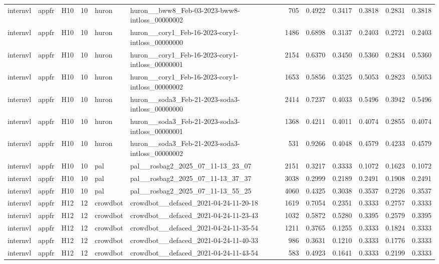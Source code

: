 \begin{table}[tbp]
\begin{tabular}{lllrllrrrrrr}
internvl & appfr & H10 & 10 & huron & huron\_\_bww8\_Feb-03-2023-bww8-intloss\_00000002 & 705 & 0.4922 & 0.3417 & 0.3818 & 0.2831 & 0.3818 \\
internvl & appfr & H10 & 10 & huron & huron\_\_cory1\_Feb-16-2023-cory1-intloss\_00000000 & 1486 & 0.6898 & 0.3137 & 0.2403 & 0.2721 & 0.2403 \\
internvl & appfr & H10 & 10 & huron & huron\_\_cory1\_Feb-16-2023-cory1-intloss\_00000001 & 2154 & 0.6370 & 0.3450 & 0.5360 & 0.2834 & 0.5360 \\
internvl & appfr & H10 & 10 & huron & huron\_\_cory1\_Feb-16-2023-cory1-intloss\_00000002 & 1653 & 0.5856 & 0.3525 & 0.5053 & 0.2823 & 0.5053 \\
internvl & appfr & H10 & 10 & huron & huron\_\_soda3\_Feb-21-2023-soda3-intloss\_00000000 & 2414 & 0.7237 & 0.4033 & 0.5496 & 0.3942 & 0.5496 \\
internvl & appfr & H10 & 10 & huron & huron\_\_soda3\_Feb-21-2023-soda3-intloss\_00000001 & 1368 & 0.4211 & 0.4011 & 0.4074 & 0.2855 & 0.4074 \\
internvl & appfr & H10 & 10 & huron & huron\_\_soda3\_Feb-21-2023-soda3-intloss\_00000002 & 531 & 0.9266 & 0.4048 & 0.4579 & 0.4233 & 0.4579 \\
internvl & appfr & H10 & 10 & pal & pal\_\_rosbag2\_2025\_07\_11-13\_23\_07 & 2151 & 0.3217 & 0.3333 & 0.1072 & 0.1623 & 0.1072 \\
internvl & appfr & H10 & 10 & pal & pal\_\_rosbag2\_2025\_07\_11-13\_37\_37 & 3038 & 0.2999 & 0.2189 & 0.2491 & 0.1908 & 0.2491 \\
internvl & appfr & H10 & 10 & pal & pal\_\_rosbag2\_2025\_07\_11-13\_55\_25 & 4060 & 0.4325 & 0.3038 & 0.3537 & 0.2726 & 0.3537 \\
internvl & appfr & H12 & 12 & crowdbot & crowdbot\_\_defaced\_2021-04-24-11-20-18 & 1619 & 0.7054 & 0.2351 & 0.3333 & 0.2757 & 0.3333 \\
internvl & appfr & H12 & 12 & crowdbot & crowdbot\_\_defaced\_2021-04-24-11-23-43 & 1032 & 0.5872 & 0.5280 & 0.3395 & 0.2579 & 0.3395 \\
internvl & appfr & H12 & 12 & crowdbot & crowdbot\_\_defaced\_2021-04-24-11-35-54 & 1211 & 0.3765 & 0.1255 & 0.3333 & 0.1824 & 0.3333 \\
internvl & appfr & H12 & 12 & crowdbot & crowdbot\_\_defaced\_2021-04-24-11-40-33 & 986 & 0.3631 & 0.1210 & 0.3333 & 0.1776 & 0.3333 \\
internvl & appfr & H12 & 12 & crowdbot & crowdbot\_\_defaced\_2021-04-24-11-43-54 & 583 & 0.4923 & 0.1641 & 0.3333 & 0.2199 & 0.3333 \\

\end{tabular}
\end{table}
